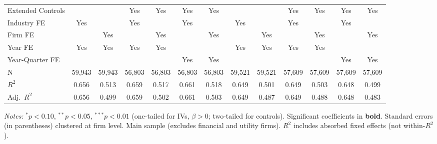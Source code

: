 \documentclass[11pt,a4paper]{article}
\begin{document}
\begin{table}[htbp]
\begin{tabular}{lcccccccccccc}
\midrule
Extended Controls &  &  & Yes & Yes & Yes & Yes &  &  & Yes & Yes & Yes & Yes \\
Industry FE & Yes &  & Yes &  & Yes &  & Yes &  & Yes &  & Yes &  \\
Firm FE &  & Yes &  & Yes &  & Yes &  & Yes &  & Yes &  & Yes \\
Year FE & Yes & Yes & Yes & Yes &  &  & Yes & Yes & Yes & Yes &  &  \\
Year-Quarter FE &  &  &  &  & Yes & Yes &  &  &  &  & Yes & Yes \\
\midrule
N & 59,943 & 59,943 & 56,803 & 56,803 & 56,803 & 56,803 & 59,521 & 59,521 & 57,609 & 57,609 & 57,609 & 57,609 \\
$R^2$ & 0.656 & 0.513 & 0.659 & 0.517 & 0.661 & 0.518 & 0.649 & 0.501 & 0.649 & 0.503 & 0.648 & 0.499 \\
Adj.~$R^2$ & 0.656 & 0.499 & 0.659 & 0.502 & 0.661 & 0.503 & 0.649 & 0.487 & 0.649 & 0.488 & 0.648 & 0.483 \\
\bottomrule
\end{tabular}
\begin{minipage}{\linewidth}
\vspace{2pt}\scriptsize
\textit{Notes:} $^{*}p<0.10$, $^{**}p<0.05$, $^{***}p<0.01$ (one-tailed for IVs, $\beta > 0$; two-tailed for controls).
 Significant coefficients in \textbf{bold}.
 Standard errors (in parentheses) clustered at firm level.
 Main sample (excludes financial and utility firms).
 $R^2$ includes absorbed fixed effects (not within-$R^2$).
\end{minipage}
\end{table}
\clearpage
\end{document}
